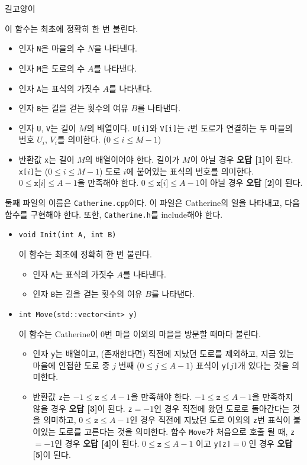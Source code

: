 \begin{problem}{길고양이}
\begin{itemize}
		이 함수는 최초에 정확히 한 번 불린다.
		\begin{itemize}
			\item 인자 \texttt{N}은 마을의 수 $N$을 나타낸다.
			\item 인자 \texttt{M}은 도로의 수 $A$를 나타낸다.
			\item 인자 \texttt{A}는 표식의 가짓수 $A$를 나타낸다.
			\item 인자 \texttt{B}는 길을 걷는 횟수의 여유 $B$를 나타낸다.
			\item 인자 \texttt{U}, \texttt{V}는 길이 $M$의 배열이다. \texttt{U[i]}와 \texttt{V[i]}는 $i$번 도로가 연결하는 두 마을의 번호 $U_i$, $V_i$를 의미한다. ($0 \le i \le M-1$)
			\item 반환값 \texttt{x}는 길이 $M$의 배열이어야 한다. 길이가 $M$이 아닐 경우 \textbf{오답 [1]}이 된다. \texttt{x[$i$]}는 ($0 \le i \le M-1$) 도로 $i$에 붙어있는 표식의 번호를 의미한다. $0 \le \texttt{x[}i\texttt{]} \le A-1$을 만족해야 한다. $0 \le \texttt{x[}i\texttt{]} \le A-1$이 아닐 경우 \textbf{오답 [2]}이 된다.
		\end{itemize}
	\end{itemize}

	둘째 파일의 이름은 \texttt{Catherine.cpp}이다. 이 파일은 Catherine의 일을 나타내고, 다음 함수를 구현해야 한다. 또한, \texttt{Catherine.h}를 include해야 한다.
	
	\begin{itemize}
		\item \texttt{void Init(int A, int B)}
		
		이 함수는 최초에 정확히 한 번 불린다.
		
		\begin{itemize}
			\item 인자 \texttt{A}는 표식의 가짓수 $A$를 나타낸다.
			\item 인자 \texttt{B}는 길을 걷는 횟수의 여유 $B$를 나타낸다.
		\end{itemize}
		
		\item \texttt{int Move(std::vector<int> y)}
		
		이 함수는 Catherine이 0번 마을 이외의 마을을 방문할 때마다 불린다.
		\begin{itemize}
			\item 인자 \texttt{y}는 배열이고, (존재한다면) 직전에 지났던 도로를 제외하고, 지금 있는 마을에 인접한 도로 중 $j$ 번째 ($ 0 \le j \le A-1$) 표식이 \texttt{y[$j$]}개 있다는 것을 의미한다.
			\item 반환값 \texttt{z}는 $-1 \le \texttt{z} \le A-1$을 만족해야 한다. $-1 \le \texttt{z} \le A-1$을 만족하지 않을 경우 \textbf{오답 [3]}이 된다. \texttt{z}$=-1$인 경우 직전에 왔던 도로로 돌아간다는 것을 의미하고, $0 \le \texttt{z} \le A-1$인 경우 직전에 지났던 도로 이외의 \texttt{z}번 표식이 붙어있는 도로를 고른다는 것을 의미한다. 함수 \texttt{Move}가 처음으로 호출 될 때, \texttt{z}$=-1$인 경우 \textbf{오답 [4]}이 된다. $0 \le \texttt{z} \le A-1$ 이고 \texttt{y[z]}$=0$ 인 경우 \textbf{오답 [5]}이 된다.
		\end{itemize}
		

\end{itemize}
\end{problem}
